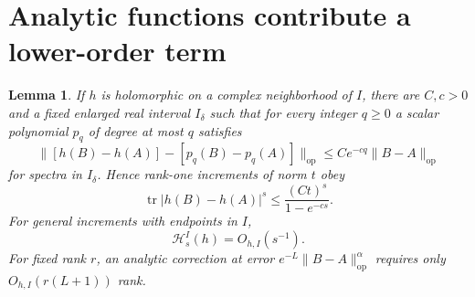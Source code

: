 \documentclass[11pt]{article}
\newtheorem{lemma}[theorem]{Lemma}
\numberwithin{equation}{section}
\newcommand{\tr}{\operatorname{tr}}
\newcommand{\op}{\mathrm{op}}
\newcommand{\cH}{\mathcal H}
\begin{document}
\section{Analytic functions contribute a lower-order term}

\begin{lemma}\label{lem:analytic}
If $h$ is holomorphic on a complex neighborhood of $I$, there are
$C,c>0$ and a fixed enlarged real interval $I_\delta$ such that for
every integer $q\ge0$ a scalar polynomial $p_q$ of degree at most $q$
satisfies
\begin{equation}\label{eq:analyticerror}
 \|[h(B)-h(A)]-[p_q(B)-p_q(A)]\|_{\op}
          \le C e^{-cq}\|B-A\|_{\op}
\end{equation}
for spectra in $I_\delta$. Hence rank-one increments of norm $t$ obey
\begin{equation}\label{eq:analytictrace}
 \tr|h(B)-h(A)|^s\le\frac{(Ct)^s}{1-e^{-cs}}.
\end{equation}
For general increments with endpoints in $I$,
\begin{equation}\label{eq:analyticH}
 \cH_s^I(h)=O_{h,I}(s^{-1}).
\end{equation}
For fixed rank $r$, an analytic correction at error
$e^{-L}\|B-A\|_{\op}^{\alpha}$ requires only $O_{h,I}(r(L+1))$ rank.
\end{lemma}
\end{document}
